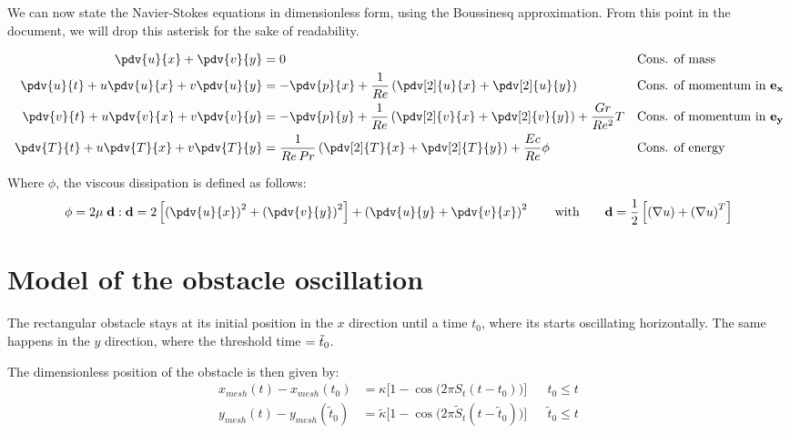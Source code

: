 \documentclass[11 pt]{article}
\begin{document}
We can now state the Navier-Stokes equations in dimensionless form, using the Boussinesq approximation. From this point in the document, we will drop this asterisk for the sake of readability.

\begin{align}
    \pdv{u}{x} + \pdv{v}{y} &= 0  && \text{Cons. of mass}\label{eq:nsMass}\\
    \pdv{u}{t} + u\pdv{u}{x} + v\pdv{u}{y} &= -\pdv{p}{x} + \frac{1}{Re} \left( \pdv[2]{u}{x} + \pdv[2]{u}{y} \right) && \text{Cons. of momentum in } \mathbf{e_{x}}\label{eq:nsMomX}\\
    \pdv{v}{t} + u\pdv{v}{x} + v\pdv{v}{y} &= -\pdv{p}{y} + \frac{1}{Re} \left( \pdv[2]{v}{x} + \pdv[2]{v}{y} \right) + \frac{Gr}{Re^2} T && \text{Cons. of momentum in } \mathbf{e_{y}}\label{eq:nsMomY}\\
    \pdv{T}{t} + u\pdv{T}{x} + v\pdv{T}{y} &= \frac{1}{Re \, Pr} \left( \pdv[2]{T}{x} + \pdv[2]{T}{y} \right) + \frac{Ec}{Re} \phi && \text{Cons. of energy} \label{eq:nsEnergy}
\end{align}

Where $\phi$, the viscous dissipation is defined as follows:
\begin{align}
    \phi = 2 \mu \; \mathbf{d:d} = 2 \left[\left(\pdv{u}{x}\right)^2 + \left(\pdv{v}{y} \right)^2\right] + \left(\pdv{u}{y} + \pdv{v}{x}\right)^2 \qquad \text{with} \qquad \mathbf{d} = \frac{1}{2} \left[\left(\nabla u\right) + \left(\nabla u\right)^T \right] \label{eq:dissipation}
\end{align}


\section{Model of the obstacle oscillation}
The rectangular obstacle stays at its initial position in the $x$ direction until a time $t_0$, where its starts oscillating horizontally. The same happens in the $y$ direction, where the threshold time $=\Tilde{t}_0$.

The dimensionless position of the obstacle is then given by:
\begin{equation}
\begin{aligned}
    x_{mesh}(t) - x_{mesh}(t_0) &= \kappa \Big[1 - \cos{\Big(2\pi S_t (t - t_0)\Big)} \Big] && t_0 \leq t\\
    y_{mesh}(t) - y_{mesh}(\tilde t_0) &= \tilde \kappa \Big[1 - \cos{\Big(2\pi \tilde S_t (t - \tilde t_0)\Big)} \Big] && \tilde t_0 \leq t
\end{aligned}
\end{equation}
\end{document}
